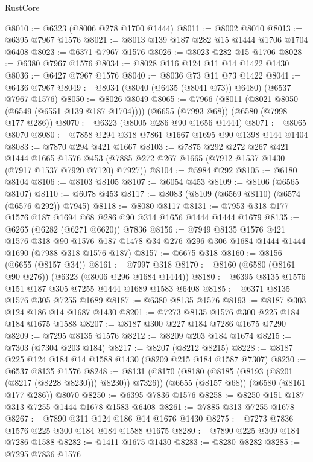 \begin{lexlean}{RustCore}
\begin{coremodule}
@8010 := @6323 (@8006 @278 @1700 @1444)
@8011 := @8002 @8010
@8013 := @6395 @7967 @1576
@8021 := @8013 @139 @187 @282 @15 @1444 @1706 @1704 @6408
@8023 := @6371 @7967 @1576
@8026 := @8023 @282 @15 @1706
@8028 := @6380 @7967 @1576
@8034 := @8028 @116 @124 @11 @14 @1422 @1430
@8036 := @6427 @7967 @1576
@8040 := @8036 @73 @11 @73 @1422
@8041 := @6436 @7967
@8049 := @8034 (@8040 (@6435 (@8041 @73)) @6480) (@6537 @7967 @1576)
@8050 := @8026 @8049
@8065 := @7966
    (@8011 (@8021 @8050 (@6549 (@6551 @139 @187 @1704))))
    (@6655 (@7993 @68))
    (@6580 (@7998 @177 @286))
@8070 := @6323 (@8005 @286 @90 @1656 @1444)
@8071 := @8065 @8070
@8080 := @7858 @294 @318 @7861 @1667 @1695 @90 @1398 @144 @1404
@8083 := @7870 @294 @421 @1667
@8103 := @7875
    @292
    @272
    @267
    @421
    @1444
    @1665
    @1576
    @453
    (@7885 @272 @267 @1665 (@7912 @1537 @1430 (@7917 @1537 @7920 @7120) @7927))
@8104 := @5984 @292
@8105 := @6180 @8104
@8106 := @8103 @8105
@8107 := @6054 @453
@8109 := @8106 (@6565 @8107)
@8110 := @6078 @453
@8117 := @8083 (@8109 (@6569 @8110) (@6574 (@6576 @292)) @7945)
@8118 := @8080 @8117
@8131 := @7953 @318 @177 @1576 @187 @1694 @68 @286 @90 @314 @1656 @1444 @1444 @1679
@8135 := @6265 (@6282 (@6271 @6620)) @7836
@8156 := @7949
    @8135
    @1576
    @421
    @1576
    @318
    @90
    @1576
    @187
    @1478
    @34
    @276
    @296
    @306
    @1684
    @1444
    @1444
    @1690
    (@7988 @318 @1576 @187)
@8157 := @6675 @318
@8160 := @8156 (@6655 (@8157 @34))
@8161 := @7997 @318
@8170 := @8160 (@6580 (@8161 @90 @276)) (@6323 (@8006 @296 @1684 @1444))
@8180 := @6395 @8135 @1576 @151 @187 @305 @7255 @1444 @1689 @1583 @6408
@8185 := @6371 @8135 @1576 @305 @7255 @1689
@8187 := @6380 @8135 @1576
@8193 := @8187 @303 @124 @186 @14 @1687 @1430
@8201 := @7273 @8135 @1576 @300 @225 @184 @184 @1675 @1588
@8207 := @8187 @300 @227 @184 @7286 @1675 @7290
@8209 := @7295 @8135 @1576
@8212 := @8209 @203 @184 @1674
@8215 := @7303 (@7304 @203 @184)
@8217 := @8207 (@8212 @8215)
@8228 := @8187 @225 @124 @184 @14 @1588 @1430 (@8209 @215 @184 @1587 @7307)
@8230 := @6537 @8135 @1576
@8248 := @8131
    (@8170 (@8180 (@8185 (@8193 (@8201 (@8217 (@8228 @8230))) @8230)) @7326))
    (@6655 (@8157 @68))
    (@6580 (@8161 @177 @286))
    @8070
@8250 := @6395 @7836 @1576
@8258 := @8250 @151 @187 @313 @7255 @1444 @1678 @1583 @6408
@8261 := @7885 @313 @7255 @1678
@8267 := @7890 @311 @124 @186 @14 @1676 @1430
@8275 := @7273 @7836 @1576 @225 @300 @184 @184 @1588 @1675
@8280 := @7890 @225 @309 @184 @7286 @1588
@8282 := @1411 @1675 @1430
@8283 := @8280 @8282
@8285 := @7295 @7836 @1576

\end{coremodule}
\end{lexlean}
